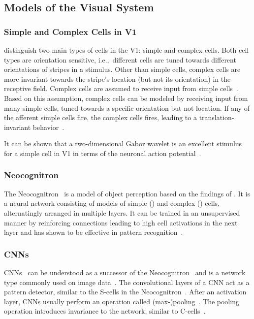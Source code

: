 \subsection{Models of the Visual System}\label{subsec:models-of-the-visual-system}


\subsubsection{Simple and Complex Cells in \acl{V1}}\label{subsubseq:simple_complex_cells}

\citet{hubel1962receptive} distinguish two main types of cells in the \ac{V1}: simple and complex cells.
Both cell types are orientation sensitive, i.e.,~different cells are tuned towards different orientations of stripes in a stimulus.
Other than simple cells, complex cells are more invariant towards the stripe's location (but not its orientation) in the receptive field.
Complex cells are assumed to receive input from simple cells~\citep{hubel1962receptive}.
Based on this assumption, complex cells can be modeled by receiving input from many simple cells, tuned towards a specific orientation but not location.
If any of the afferent simple cells fire, the complex cells fires, leading to a translation-invariant behavior~\citep{hubel1962receptive}.

It can be shown that a two-dimensional Gabor wavelet is an excellent stimulus for a simple cell in \ac{V1} in terms of the neuronal action potential~\citep{jones1987evaluation}.

\subsubsection{Neocognitron}

The Neocognitron~\citep{fukushima1980neocognitron} is a model of object perception based on the findings of \citet{hubel1962receptive}.
It is a neural network consisting of models of simple () and complex () cells, alternatingly arranged in multiple layers.
It can be trained in an unsupervised manner by reinforcing connections leading to high cell activations in the next layer and has shown to be effective in pattern recognition~\citep{fukushima1980neocognitron}.

\subsubsection{\aclp{CNN}}\label{subsubsec:cnn_model_visual_system}
\acp{CNN}~\citep{lecun1989backpropagation} can be understood as a successor of the Neocognitron~\citep{lindsay2020convolutional} and is a network type commonly used on image data~\citep[p. 326]{Goodfellow-et-al-2016}.
The convolutional layers of a \ac{CNN} act as a pattern detector, similar to the S-cells in the Neocognitron~\citep{lindsay2020convolutional}.
After an activation layer, \acp{CNN} usually perform an operation called (max-)pooling~\citep[pp. 326, 339]{Goodfellow-et-al-2016}.
The pooling operation introduces invariance to the network, similar to C-cells~\citep{lindsay2020convolutional}.

